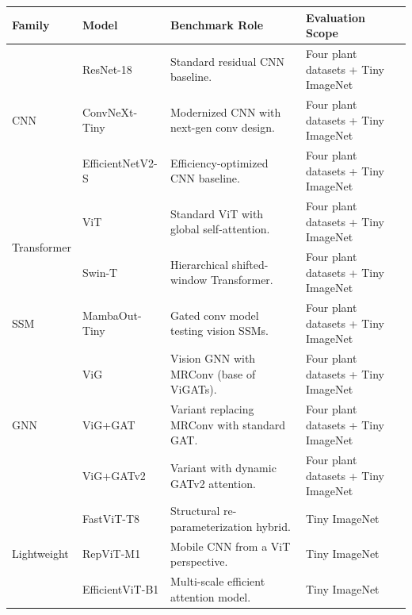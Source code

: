 \documentclass[]{interact}
\theoremstyle{plain}
\theoremstyle{definition}
\theoremstyle{remark}
\begin{document}
{\begin{table}[H]
\small
\setlength{\tabcolsep}{3.0pt}
\renewcommand{\arraystretch}{1.15}
{\begin{tabular}{@{}p{1.55cm}p{4.70cm}p{5.55cm}p{2.65cm}@{}} \toprule
\textbf{Family} & \textbf{Model} & \textbf{Benchmark Role} & \textbf{Evaluation Scope} \\ \midrule
\multirow{3}{*}{CNN}
 & ResNet-18 \citep{he2016deep} & Standard residual CNN baseline. & Four plant datasets + Tiny ImageNet \\
 & ConvNeXt-Tiny \citep{liu2022convnext} & Modernized CNN with next-gen conv design. & Four plant datasets + Tiny ImageNet \\
 & EfficientNetV2-S \citep{tan2021efficientnetv2} & Efficiency-optimized CNN baseline. & Four plant datasets + Tiny ImageNet \\ \midrule
\multirow{2}{*}{Transformer}
 & ViT \citep{dosovitskiy2020image} & Standard ViT with global self-attention. & Four plant datasets + Tiny ImageNet \\
 & Swin-T \citep{liu2021swin} & Hierarchical shifted-window Transformer. & Four plant datasets + Tiny ImageNet \\ \midrule
SSM
 & MambaOut-Tiny \citep{yu2024mambaout} & Gated conv model testing vision SSMs. & Four plant datasets + Tiny ImageNet \\ \midrule
\multirow{3}{*}{GNN}
 & ViG \citep{han2022vision} & Vision GNN with MRConv (base of ViGATs). & Four plant datasets + Tiny ImageNet \\
 & ViG+GAT \citep{velickovic2018graph} & Variant replacing MRConv with standard GAT. & Four plant datasets + Tiny ImageNet \\
 & ViG+GATv2 \citep{brody2022gat} & Variant with dynamic GATv2 attention. & Four plant datasets + Tiny ImageNet \\ \midrule
\multirow{3}{*}{Lightweight}
 & FastViT-T8 \citep{vasu2023fastvit} & Structural re-parameterization hybrid. & Tiny ImageNet \\
 & RepViT-M1 \citep{wang2024repvit} & Mobile CNN from a ViT perspective. & Tiny ImageNet \\
 & EfficientViT-B1 \citep{cai2023efficientvit} & Multi-scale efficient attention model. & Tiny ImageNet \\ \bottomrule
\end{tabular}}
\label{tab:benchmark_models}
\end{table}

}
\end{document}

